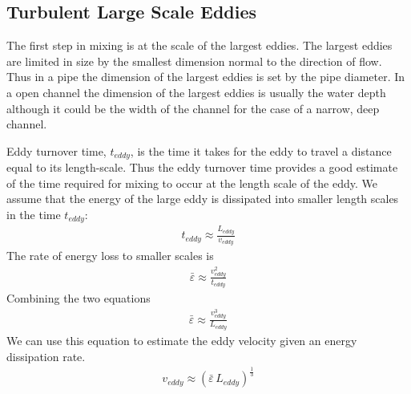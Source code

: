 \documentclass[letterpaper,10pt,english]{sphinxmanual}
\begin{document}
\subsection{Turbulent Large Scale Eddies}
\label{\detokenize{Rapid_Mix/RM_Derivations:turbulent-large-scale-eddies}}\label{\detokenize{Rapid_Mix/RM_Derivations:heading-turbulent-large-scale-eddies}}
The first step in mixing is at the scale of the largest eddies. The largest eddies are limited in size by the smallest dimension normal to the direction of flow. Thus in a pipe the dimension of the largest eddies is set by the pipe diameter. In a open channel the dimension of the largest eddies is usually the water depth although it could be the width of the channel for the case of a narrow, deep channel.

Eddy turnover time, \(t_{eddy}\), is the time it takes for the eddy to travel a distance equal to its length-scale. Thus the eddy turnover time provides a good estimate of the time required for mixing to occur at the length scale of the eddy. We assume that the energy of the large eddy is dissipated into smaller length scales in the time \(t_{eddy}\):
\begin{equation}\label{equation:Rapid_Mix/RM_Derivations:Rapid_Mix/RM_Derivations:35}
\begin{split}t_{eddy} \approx \frac{L_{eddy}}{v_{eddy}}\end{split}
\end{equation}
The rate of energy loss to smaller scales is
\begin{equation}\label{equation:Rapid_Mix/RM_Derivations:Rapid_Mix/RM_Derivations:36}
\begin{split}\bar\varepsilon \approx\frac{v_{eddy}^2}{t_{eddy}}\end{split}
\end{equation}
Combining the two equations
\begin{equation}\label{equation:Rapid_Mix/RM_Derivations:Rapid_Mix/RM_Derivations:37}
\begin{split}\bar\varepsilon \approx\frac{v_{eddy}^3}{L_{eddy}}\end{split}
\end{equation}
We can use this equation to estimate the eddy velocity given an energy dissipation rate.
\begin{equation}\label{equation:Rapid_Mix/RM_Derivations:Rapid_Mix/RM_Derivations:38}
\begin{split}v_{eddy} \approx \left( \bar\varepsilon \, L_{eddy} \right)^\frac{1}{3}\end{split}
\end{equation}
\end{document}
